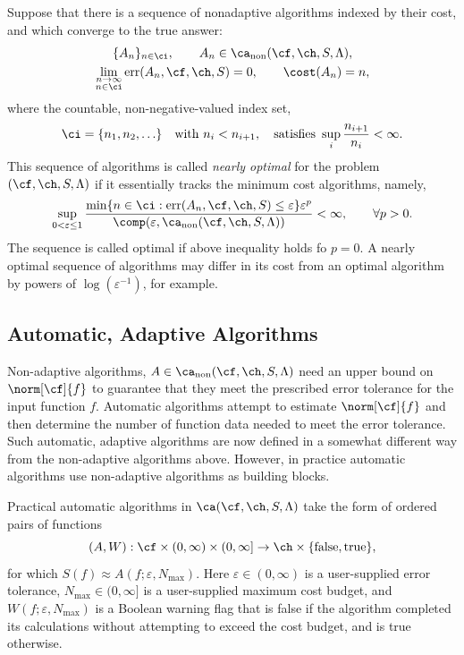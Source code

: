 \documentclass[]{elsarticle}
\DeclareMathOperator{\fix}{non}
\DeclareMathOperator{\err}{err}
\theoremstyle{definition}
\theoremstyle{remark}
\begin{document}
Suppose that there is a sequence of nonadaptive algorithms indexed by their cost, and which converge to the true answer:
\begin{subequations} \label{algseqdef}
\begin{gather} 
\{A_n\}_{n \in \ci}, \qquad A_n  \in \ca_{\fix}(\cf,\ch,S,\Lambda), \\
\lim_{\substack{n \to \infty\\ n \in \ci}} \err(A_n,\cf,\ch,S) = 0, \qquad \cost(A_n) = n,  
\end{gather}
\end{subequations}
where the countable, non-negative-valued index set, 
\begin{equation} \label{indexdef}
\ci=\{n_1, n_2, \ldots\} \quad \text{with } n_i < n_{i+1}, \quad \text{satisfies } \sup_i \frac{n_{i+1}}{n_i} <\infty. 
\end{equation} 
This sequence of algorithms is called \emph{nearly optimal} for the problem $(\cf,\ch,S,\Lambda)$ if it essentially tracks the minimum cost algorithms, namely,
\begin{equation} \label{nearoptdef}
\sup_{0 < \varepsilon \le 1} \frac{\min\{n \in \ci : \err(A_n,\cf,\ch,S) \le \varepsilon\} \varepsilon^p}{\comp(\varepsilon,\ca_{\fix}(\cf,\ch,S,\Lambda))} <\infty, \qquad \forall p>0.
\end{equation}
The sequence is called optimal if above inequality holds fo $p=0$.  A nearly optimal sequence of algorithms may differ in its cost from an optimal algorithm by powers of $\log(\varepsilon^{-1})$, for example.


\subsection{Automatic, Adaptive Algorithms}

Non-adaptive algorithms, $A \in \ca_{\fix}(\cf,\ch,S,\Lambda)$ need an upper bound on $\norm[\cf]{f}$ to guarantee that they meet the prescribed error tolerance for the input function $f$.  Automatic algorithms attempt to estimate $\norm[\cf]{f}$ and then determine the number of function data needed to meet the error tolerance.  Such automatic, adaptive algorithms are now defined in a somewhat different way from the non-adaptive algorithms above.  However, in practice automatic algorithms use non-adaptive algorithms as building blocks.

Practical automatic algorithms in $\ca(\cf,\ch,S,\Lambda)$ take the form of ordered pairs of functions
\[
(A,W): \cf \times (0,\infty)\times (0,\infty] \to \ch \times \{\text{false},\text{true}\},
\]
for which $S(f) \approx A(f;\varepsilon,N_{\max})$.  Here $\varepsilon \in (0,\infty)$ is a user-supplied error tolerance, $N_{\max} \in (0,\infty]$ is a user-supplied maximum cost budget, and $W(f;\varepsilon,N_{\max})$ is a Boolean warning flag that is false if the algorithm completed its calculations without attempting to exceed the cost budget, and is true otherwise.  
\end{document}
